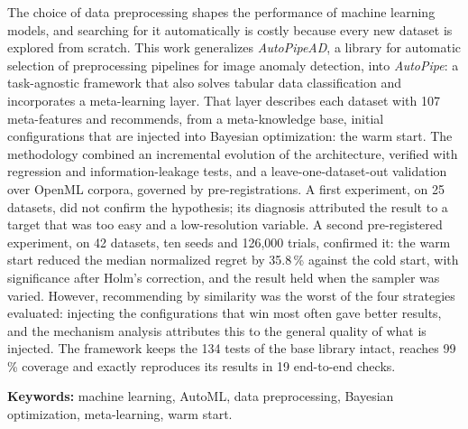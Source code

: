 \documentclass[12pt,letterpaper,oneside]{article}
\begin{document}
The choice of data preprocessing shapes the performance of machine learning models, and
searching for it automatically is costly because every new dataset is explored from scratch.
This work generalizes \textit{AutoPipeAD}, a library for automatic selection of preprocessing
pipelines for image anomaly detection, into \textit{AutoPipe}: a task-agnostic framework that
also solves tabular data classification and incorporates a meta-learning layer. That layer
describes each dataset with 107 meta-features and recommends, from a meta-knowledge base,
initial configurations that are injected into Bayesian optimization: the warm start. The
methodology combined an incremental evolution of the architecture, verified with regression
and information-leakage tests, and a leave-one-dataset-out validation over OpenML corpora,
governed by pre-registrations. A first experiment, on 25 datasets, did not confirm the
hypothesis; its diagnosis attributed the result to a target that was too easy and a
low-resolution variable. A
second pre-registered experiment, on 42 datasets, ten seeds and 126,000 trials, confirmed it:
the warm start reduced the median normalized regret by 35.8\,\% against the cold start, with
significance after Holm's correction, and the result held when the sampler was varied.
However, recommending by similarity was the worst of the four strategies evaluated: injecting
the configurations that win most often gave better results, and the mechanism analysis
attributes this to the general quality of what is injected. The framework keeps the 134 tests of the base library
intact, reaches 99\,\% coverage and exactly reproduces its results in 19 end-to-end checks.

\vspace{1em}
\noindent\textbf{Keywords:} machine learning, AutoML, data preprocessing, Bayesian
optimization, meta-learning, warm start.

\clearpage
\renewcommand{\contentsname}{ÍNDICE GENERAL}
{}
\begingroup
\singlespacing
\tableofcontents
\endgroup

\clearpage
\renewcommand{\listtablename}{ÍNDICE DE TABLAS}
{}
\begingroup
\singlespacing
\listoftables
\endgroup
\end{document}
